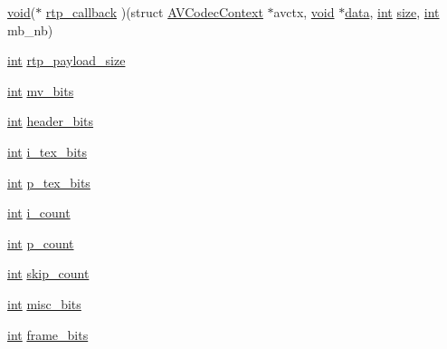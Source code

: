 \begin{DoxyCompactItemize}
\item 
\hyperlink{sound_8c_ae35f5844602719cf66324f4de2a658b3}{void}($\ast$ \hyperlink{struct_a_v_codec_context_a74ed2f7e2b165061c13f69dd0758f107}{rtp\+\_\+callback} )(struct \hyperlink{struct_a_v_codec_context}{A\+V\+Codec\+Context} $\ast$avctx, \hyperlink{sound_8c_ae35f5844602719cf66324f4de2a658b3}{void} $\ast$\hyperlink{lib_2expat_8h_ac39e72a1de1cb50dbdc54b08d0432a24}{data}, \hyperlink{xmltok_8h_a5a0d4a5641ce434f1d23533f2b2e6653}{int} \hyperlink{group__lavu__mem_ga854352f53b148adc24983a58a1866d66}{size}, \hyperlink{xmltok_8h_a5a0d4a5641ce434f1d23533f2b2e6653}{int} mb\+\_\+nb)
\item 
\hyperlink{xmltok_8h_a5a0d4a5641ce434f1d23533f2b2e6653}{int} \hyperlink{struct_a_v_codec_context_a583019faf28da26e282be834cd9a7d8f}{rtp\+\_\+payload\+\_\+size}
\item 
\hyperlink{xmltok_8h_a5a0d4a5641ce434f1d23533f2b2e6653}{int} \hyperlink{struct_a_v_codec_context_a746bd6985c9fa8763d7544c0041c66a9}{mv\+\_\+bits}
\item 
\hyperlink{xmltok_8h_a5a0d4a5641ce434f1d23533f2b2e6653}{int} \hyperlink{struct_a_v_codec_context_af91d7a57d14f1cc5d5fc413755aea3f0}{header\+\_\+bits}
\item 
\hyperlink{xmltok_8h_a5a0d4a5641ce434f1d23533f2b2e6653}{int} \hyperlink{struct_a_v_codec_context_a6bc43abf810bfbc0c9a4fb17ca4b2ec1}{i\+\_\+tex\+\_\+bits}
\item 
\hyperlink{xmltok_8h_a5a0d4a5641ce434f1d23533f2b2e6653}{int} \hyperlink{struct_a_v_codec_context_a3afad86bb36a66785ba1da25ce557fb1}{p\+\_\+tex\+\_\+bits}
\item 
\hyperlink{xmltok_8h_a5a0d4a5641ce434f1d23533f2b2e6653}{int} \hyperlink{struct_a_v_codec_context_a2f29029c23a73b768eb77b792f6e6547}{i\+\_\+count}
\item 
\hyperlink{xmltok_8h_a5a0d4a5641ce434f1d23533f2b2e6653}{int} \hyperlink{struct_a_v_codec_context_ae9c7434aa338d941423b45034e2a7854}{p\+\_\+count}
\item 
\hyperlink{xmltok_8h_a5a0d4a5641ce434f1d23533f2b2e6653}{int} \hyperlink{struct_a_v_codec_context_a801dcbc834a3afae4b98053b56855a98}{skip\+\_\+count}
\item 
\hyperlink{xmltok_8h_a5a0d4a5641ce434f1d23533f2b2e6653}{int} \hyperlink{struct_a_v_codec_context_ac1316f12a3e77a1e28044d537bb58cca}{misc\+\_\+bits}
\item 
\hyperlink{xmltok_8h_a5a0d4a5641ce434f1d23533f2b2e6653}{int} \hyperlink{struct_a_v_codec_context_a9ffba99ce690996d839032cd3b0be299}{frame\+\_\+bits}
\item 

\end{DoxyCompactItemize}
